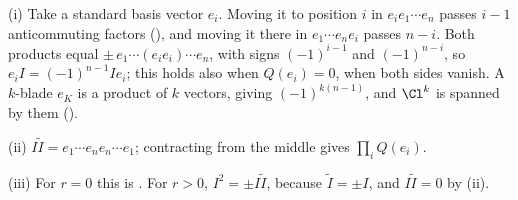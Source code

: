 (i) Take a standard basis vector $e_i$. Moving it to position $i$ in $e_i e_1 \cdots e_n$ passes $i - 1$ anticommuting factors (), and moving it there in $e_1 \cdots e_n e_i$ passes $n - i$. Both products equal $\pm\, e_1 \cdots (e_i e_i) \cdots e_n$, with signs $(-1)^{i-1}$ and $(-1)^{n-i}$, so $e_i I = (-1)^{n-1} I e_i$; this holds also when $Q(e_i) = 0$, when both sides vanish. A $k$-blade $e_K$ is a product of $k$ vectors, giving $(-1)^{k(n-1)}$, and $\Cl^{k}$ is spanned by them ().

(ii) $I \tilde{I} = e_1 \cdots e_n e_n \cdots e_1$; contracting from the middle gives $\prod_i Q(e_i)$.

(iii) For $r = 0$ this is . For $r > 0$, $I^{2} = \pm I \tilde{I}$, because $\tilde{I} = \pm I$, and $I\tilde{I} = 0$ by (ii).
